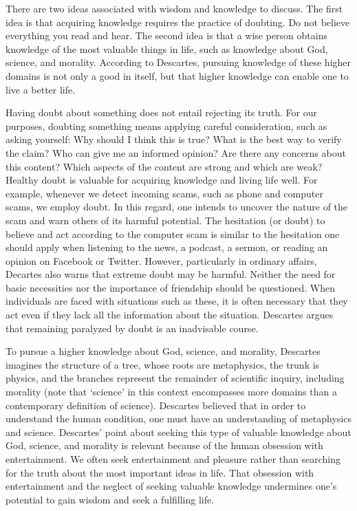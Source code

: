 \documentclass[
]{book}
\begin{document}
There are two ideas associated with wisdom and knowledge to discuss. The first idea is that acquiring knowledge requires the practice of doubting. Do not believe everything you read and hear. The second idea is that a wise person obtains knowledge of the most valuable things in life, such as knowledge about God, science, and morality. According to Descartes, pursuing knowledge of these higher domains is not only a good in itself, but that higher knowledge can enable one to live a better life.

Having doubt about something does not entail rejecting its truth. For our purposes, doubting something means applying careful consideration, such as asking yourself: Why should I think this is true? What is the best way to verify the claim? Who can give me an informed opinion? Are there any concerns about this content? Which aspects of the content are strong and which are weak? Healthy doubt is valuable for acquiring knowledge and living life well. For example, whenever we detect incoming scams, such as phone and computer scams, we employ doubt. In this regard, one intends to uncover the nature of the scam and warn others of its harmful potential. The hesitation (or doubt) to believe and act according to the computer scam is similar to the hesitation one should apply when listening to the news, a podcast, a sermon, or reading an opinion on Facebook or Twitter. However, particularly in ordinary affairs, Decartes also warns that extreme doubt may be harmful. Neither the need for basic necessities nor the importance of friendship should be questioned. When individuals are faced with situations such as these, it is often necessary that they act even if they lack all the information about the situation. Descartes argues that remaining paralyzed by doubt is an inadvisable course.

To pursue a higher knowledge about God, science, and morality, Descartes imagines the structure of a tree, whose roots are metaphysics, the trunk is physics, and the branches represent the remainder of scientific inquiry, including morality (note that `science' in this context encompasses more domains than a contemporary definition of science). Descartes believed that in order to understand the human condition, one must have an understanding of metaphysics and science. Descartes' point about seeking this type of valuable knowledge about God, science, and morality is relevant because of the human obsession with entertainment. We often seek entertainment and pleasure rather than searching for the truth about the most important ideas in life. That obsession with entertainment and the neglect of seeking valuable knowledge undermines one's potential to gain wisdom and seek a fulfilling life.
\end{document}
